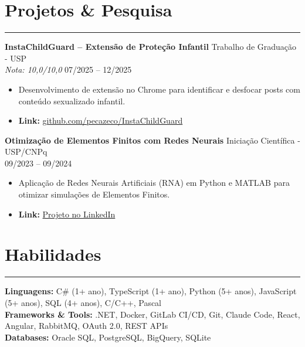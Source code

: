 \documentclass[10pt,a4paper]{article}
\begin{document}
\section*{Projetos \& Pesquisa}
\hrule \vspace{2mm}
\textbf{InstaChildGuard -- Extensão de Proteção Infantil} \hfill Trabalho de Graduação - USP \\
\textit{Nota: 10,0/10,0} \hfill 07/2025 -- 12/2025
\begin{itemize}[nosep]
    \item Desenvolvimento de extensão no Chrome para identificar e desfocar posts com conteúdo sexualizado infantil.
    \item \textbf{Link:} \href{https://github.com/pecazeco/InstaChildGuard}{github.com/pecazeco/InstaChildGuard}
\end{itemize}


\textbf{Otimização de Elementos Finitos com Redes Neurais} \hfill Iniciação Científica - USP/CNPq \\
\textit{} \hfill 09/2023 -- 09/2024
\begin{itemize}[nosep]
    \item Aplicação de Redes Neurais Artificiais (RNA) em Python e MATLAB para otimizar simulações de Elementos Finitos.
    \item \textbf{Link:} \href{https://www.linkedin.com/in/pecazeco/overlay/Project/1245750859/treasury/?profileId=ACoAAB0DOEEB_8QK5O0kMffFFd9R2OcO3bHhrBg}{Projeto no LinkedIn}
\end{itemize}

\section*{Habilidades}
\hrule \vspace{2mm}
\textbf{Linguagens:} C\# (1+ ano), TypeScript (1+ ano), Python (5+ anos), JavaScript (5+ anos), SQL (4+ anos), C/C++, Pascal \\
\textbf{Frameworks \& Tools:} .NET, Docker, GitLab CI/CD, Git, Claude Code, React, Angular, RabbitMQ, OAuth 2.0, REST APIs \\
\textbf{Databases:} Oracle SQL, PostgreSQL, BigQuery, SQLite
\end{document}
